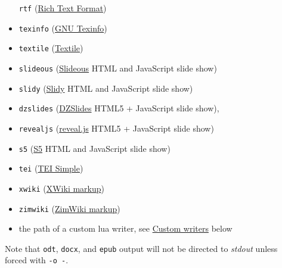 \documentclass[
  12pt,
  a4paper,
]{article}
\begin{document}
\begin{description}
\begin{itemize}
  \texttt{rtf} (\href{http://en.wikipedia.org/wiki/Rich_Text_Format}{Rich Text Format})
\item
  \texttt{texinfo} (\href{http://www.gnu.org/software/texinfo/}{GNU Texinfo})
\item
  \texttt{textile} (\href{http://redcloth.org/textile}{Textile})
\item
  \texttt{slideous} (\href{http://goessner.net/articles/slideous/}{Slideous} HTML and JavaScript
  slide show)
\item
  \texttt{slidy} (\href{http://www.w3.org/Talks/Tools/Slidy/}{Slidy} HTML and JavaScript slide
  show)
\item
  \texttt{dzslides} (\href{http://paulrouget.com/dzslides/}{DZSlides} HTML5 + JavaScript slide
  show),
\item
  \texttt{revealjs} (\href{http://lab.hakim.se/reveal-js/}{reveal.js} HTML5 + JavaScript slide
  show)
\item
  \texttt{s5} (\href{http://meyerweb.com/eric/tools/s5/}{S5} HTML and JavaScript slide show)
\item
  \texttt{tei} (\href{https://github.com/TEIC/TEI-Simple}{TEI Simple})
\item
  \texttt{xwiki}
  (\href{https://www.xwiki.org/xwiki/bin/view/Documentation/UserGuide/Features/XWikiSyntax/}{XWiki
  markup})
\item
  \texttt{zimwiki} (\href{http://zim-wiki.org/manual/Help/Wiki_Syntax.html}{ZimWiki markup})
\item
  the path of a custom lua writer, see \protect\hyperlink{custom-writers}{Custom writers} below
\end{itemize}

Note that \texttt{odt}, \texttt{docx}, and \texttt{epub} output will not be directed to
\emph{stdout} unless forced with \texttt{-o\ -}.


\end{description}
\end{document}
